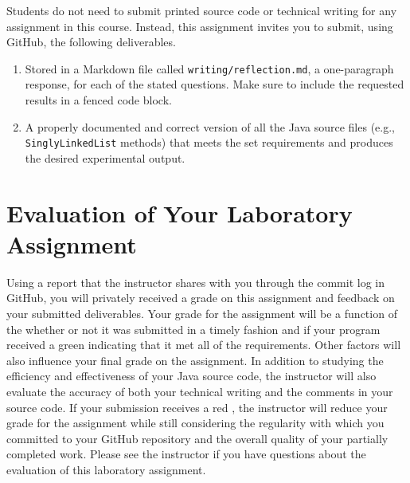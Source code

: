 \documentclass[11pt]{article}
\newcommand{\reflection}{\lstinline{writing/reflection.md}}
\newcommand{\program}[1]{\lstinline{#1}}
\newcommand{\checkmark}{\ding{51}}
\newcommand{\naughtmark}{\ding{55}}
\begin{document}
\noindent Students do not need to submit printed source code or technical
writing for any assignment in this course. Instead, this assignment invites you
to submit, using GitHub, the following deliverables.

\vspace*{-.05in}

\begin{enumerate}

  \setlength{\itemsep}{0in}

\item Stored in a Markdown file called \reflection{}, a one-paragraph response,
  for each of the stated questions. Make sure to include the requested results
  in a fenced code block.

\item A properly documented and correct version of all the Java source files
  (e.g., \program{SinglyLinkedList} methods) that meets the set requirements and
  produces the desired experimental output.

\end{enumerate}

\vspace*{-.1in}

\section*{Evaluation of Your Laboratory Assignment}

Using a report that the instructor shares with you through the commit log in
GitHub, you will privately received a grade on this assignment and feedback on
your submitted deliverables. Your grade for the assignment will be a function of
the whether or not it was submitted in a timely fashion and if your program
received a green \checkmark{} indicating that it met all of the requirements.
Other factors will also influence your final grade on the assignment. In
addition to studying the efficiency and effectiveness of your Java source code,
the instructor will also evaluate the accuracy of both your technical writing
and the comments in your source code. If your submission receives a red
\naughtmark{}, the instructor will reduce your grade for the assignment while
still considering the regularity with which you committed to your GitHub
repository and the overall quality of your partially completed work. Please see
the instructor if you have questions about the evaluation of this laboratory
assignment.

\end{document}

